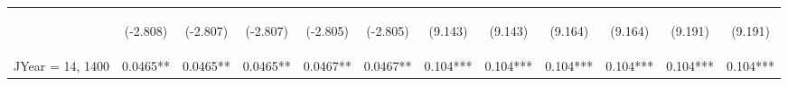 \documentclass[]{article}
\begin{document}
\begin{center}
\begin{tabular}{lccccccccccc}
        \vspace{4pt}     & \begin{footnotesize}(-2.808)\end{footnotesize} & \begin{footnotesize}(-2.807)\end{footnotesize} & \begin{footnotesize}(-2.807)\end{footnotesize} & \begin{footnotesize}(-2.805)\end{footnotesize} & \begin{footnotesize}(-2.805)\end{footnotesize} & \begin{footnotesize}(9.143)\end{footnotesize}   & \begin{footnotesize}(9.143)\end{footnotesize}   & \begin{footnotesize}(9.164)\end{footnotesize}  & \begin{footnotesize}(9.164)\end{footnotesize}  & \begin{footnotesize}(9.191)\end{footnotesize}  & \begin{footnotesize}(9.191)\end{footnotesize}  \\
        JYear = 14, 1400 & 0.0465**                                       & 0.0465**                                       & 0.0465**                                       & 0.0467**                                       & 0.0467**                                       & 0.104***                                        & 0.104***                                        & 0.104***                                       & 0.104***                                       & 0.104***                                       & 0.104***                                       \\

\end{tabular}
\end{center}
\end{document}
